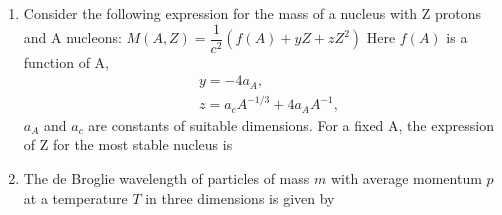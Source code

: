 \documentclass[14pt, a4paper]{extarticle}
\begin{document}
\begin{enumerate}[label=\textbf{Q. \arabic*}, start=21]
\item Consider the following expression for the mass of a nucleus with Z protons and A nucleons:
$M(A,Z) = \dfrac{1}{c^2}(f(A) + yZ + zZ^2)$
Here $f(A)$ is a function of A,
\begin{align*}
& y = -4a_A, \\
& z = a_c A^{-1/3} + 4a_A A^{-1},
\end{align*}
$a_A$ and $a_c$ are constants of suitable dimensions. For a fixed A, the expression of Z for the most stable nucleus is
\begin{enumerate}[label=(\Alph*)]
\end{enumerate}

\item The de Broglie wavelength of particles of mass $m$ with average momentum $p$ at a temperature $T$ in three dimensions is given by
\begin{enumerate}[label=(\Alph*)]
\end{enumerate}




\end{enumerate}
\end{document}
